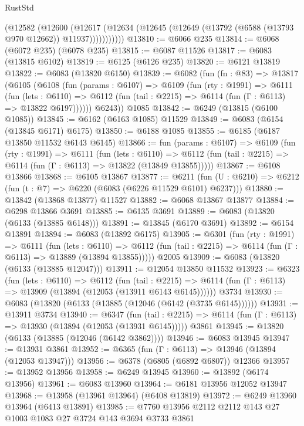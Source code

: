 \begin{lexlean}{RustStd}
\begin{coremodule}
            (@12582
              (@12600
                (@12617
                  (@12634 (@12645 (@12649 (@13792 (@6588 (@13793 @970 @12662)) @11937)))))))))))
@13810 := @6066 @235
@13814 := @6068 (@6072 @235) (@6078 @235)
@13815 := @6087 @11526
@13817 := @6083 (@13815 @6102)
@13819 := @6125 (@6126 @235)
@13820 := @6121 @13819
@13822 := @6083 (@13820 @6150)
@13839 := @6082
    (fun (fn : @83) =>
    @13817
      (@6105
        (@6108
          (fun (params : @6107) =>
          @6109
            (fun (rty : @1991) =>
            @6111
              (fun (lets : @6110) =>
              @6112 (fun (tail : @2215) => @6114 (fun (Γ : @6113) => @13822 @6197))))))
        @6243))
    @1085
@13842 := @6249 (@13815 (@6100 @1085))
@13845 := @6162 (@6163 @1085) @11529
@13849 := @6083 (@6154 (@13845 @6171) @6175)
@13850 := @6188 @1085
@13855 := @6185 (@6187 @13850 @11532 @6143 @6145)
@13866 := fun (params : @6107) =>
  @6109
    (fun (rty : @1991) =>
    @6111
      (fun (lets : @6110) =>
      @6112 (fun (tail : @2215) => @6114 (fun (Γ : @6113) => @13822 (@13849 @13855)))))
@13867 := @6108 @13866
@13868 := @6105 @13867
@13877 := @6211
    (fun (U : @6210) => @6212 (fun (t : @7) => @6220 (@6083 (@6226 @11529 @6101) @6237)))
@13880 := @13842 (@13868 @13877) @11527
@13882 := @6068 @13867 @13877
@13884 := @6298 @13866 @3691
@13885 := @6135 @3691
@13889 := @6083 (@13820 (@6133 (@13885 @6148)))
@13891 := @13845 (@6170 @3691)
@13892 := @6154 @13891
@13894 := @6083 (@13892 @6175)
@13905 := @6301
    (fun (rty : @1991) =>
    @6111
      (fun (lets : @6110) =>
      @6112 (fun (tail : @2215) => @6114 (fun (Γ : @6113) => @13889 (@13894 @13855)))))
    @2005
@13909 := @6083 (@13820 (@6133 (@13885 @12047)))
@13911 := @12054 @13850 @11532
@13923 := @6323
    (fun (lets : @6110) =>
    @6112
      (fun (tail : @2215) =>
      @6114 (fun (Γ : @6113) => @13909 (@13894 (@12053 (@13911 @6143 @6145))))))
    @3734
@13930 := @6083 (@13820 (@6133 (@13885 (@12046 (@6142 (@3735 @6145))))))
@13931 := @13911 @3734
@13940 := @6347
    (fun (tail : @2215) => @6114 (fun (Γ : @6113) => @13930 (@13894 (@12053 (@13931 @6145)))))
    @3861
@13945 := @13820 (@6133 (@13885 (@12046 (@6142 @3862))))
@13946 := @6083 @13945
@13947 := @13931 @3861
@13952 := @6365 (fun (Γ : @6113) => @13946 (@13894 (@12053 @13947)))
@13956 := @6378 (@6805 (@6892 @6807)) @12366
@13957 := @13952 @13956
@13958 := @6249 @13945
@13960 := @13892 (@6174 @13956)
@13961 := @6083 @13960
@13964 := @6181 @13956 @12052 @13947
@13968 := @13958 (@13961 @13964) (@6408 @13819)
@13972 := @6249 @13960 @13964 (@6413 @13891)
@13985 := @7760 @13956 @2112 @2112 @143 @27 @1003 @1083 @27 @3724 @143 @3694 @3733 @3861

\end{coremodule}
\end{lexlean}
